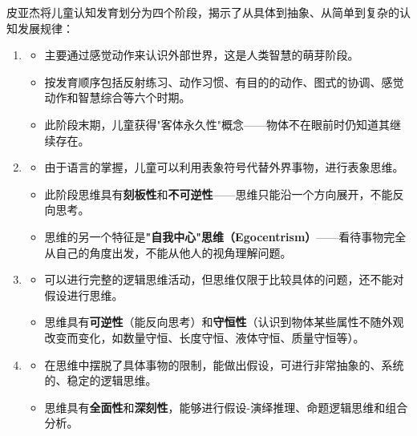 \begin{keybox}
\textbf{}

皮亚杰将儿童认知发育划分为四个阶段，揭示了从具体到抽象、从简单到复杂的认知发展规律：

\begin{enumerate}[leftmargin=*]
    \item {}
    \begin{itemize}[leftmargin=*]
        \item 主要通过感觉动作来认识外部世界，这是人类智慧的萌芽阶段。
        \item 按发育顺序包括反射练习、动作习惯、有目的的动作、图式的协调、感觉动作和智慧综合等六个时期。
        \item 此阶段末期，儿童获得"客体永久性"概念——物体不在眼前时仍知道其继续存在。
    \end{itemize}

    \item {}
    \begin{itemize}[leftmargin=*]
        \item 由于语言的掌握，儿童可以利用表象符号代替外界事物，进行表象思维。
        \item 此阶段思维具有\textbf{刻板性}和\textbf{不可逆性}——思维只能沿一个方向展开，不能反向思考。
        \item 思维的另一个特征是\textbf{"自我中心"思维（Egocentrism）}——看待事物完全从自己的角度出发，不能从他人的视角理解问题。
    \end{itemize}

    \item {}
    \begin{itemize}[leftmargin=*]
        \item 可以进行完整的逻辑思维活动，但思维仅限于比较具体的问题，还不能对假设进行思维。
        \item 思维具有\textbf{可逆性}（能反向思考）和\textbf{守恒性}（认识到物体某些属性不随外观改变而变化，如数量守恒、长度守恒、液体守恒、质量守恒等）。
    \end{itemize}

    \item {}
    \begin{itemize}[leftmargin=*]
        \item 在思维中摆脱了具体事物的限制，能做出假设，可进行非常抽象的、系统的、稳定的逻辑思维。
        \item 思维具有\textbf{全面性}和\textbf{深刻性}，能够进行假设-演绎推理、命题逻辑思维和组合分析。
    \end{itemize}
\end{enumerate}
\end{keybox}


